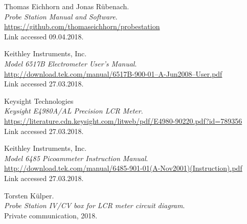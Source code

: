 \documentclass[a4paper]{article}
\begin{document}
\newpage
\begin{thebibliography}{}

 Thomas Eichhorn and Jonas R\"ubenach.\\ {\em Probe Station Manual and Software}.\\ \href{https://github.com/thomaseichhorn/probestation}{https://github.com/thomaseichhorn/probestation}\\ Link accessed 09.04.2018.

 Keithley Instruments, Inc.\\ {\em Model 6517B Electrometer User’s Manual}.\\ \href{http://download.tek.com/manual/6517B-900-01--A-Jun2008--User.pdf}{http://download.tek.com/manual/6517B-900-01--A-Jun2008--User.pdf}\\ Link accessed 27.03.2018.

 Keysight Technologies\\ {\em Keysight E4980A/AL Precision LCR Meter}.\\ \href{https://literature.cdn.keysight.com/litweb/pdf/E4980-90220.pdf?id=789356}{https://literature.cdn.keysight.com/litweb/pdf/E4980-90220.pdf?id=789356}\\ Link accessed 27.03.2018.

 Keithley Instruments, Inc.\\ {\em Model 6485 Picoammeter Instruction Manual}.\\ \href{http://download.tek.com/manual/6485-901-01(A-Nov2001)(Instruction).pdf}{http://download.tek.com/manual/6485-901-01(A-Nov2001)(Instruction).pdf}\\ Link accessed 27.03.2018.

 Torsten K\"ulper.\\ {\em Probe Station IV/CV box for LCR meter circuit diagram}.\\ Private communication, 2018.

\end{thebibliography}
\end{document}
